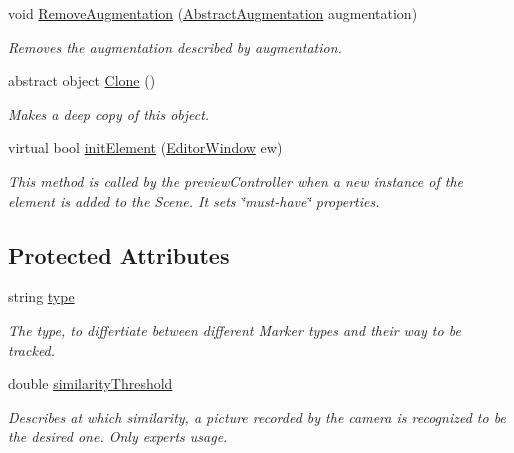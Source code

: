 \begin{DoxyCompactItemize}
void \hyperlink{class_a_rdev_kit_1_1_model_1_1_project_1_1_abstract_trackable_ae14b72d85d610bcda17d93255bce45f7}{Remove\-Augmentation} (\hyperlink{class_a_rdev_kit_1_1_model_1_1_project_1_1_abstract_augmentation}{Abstract\-Augmentation} augmentation)
\begin{DoxyCompactList}\small\item\em Removes the augmentation described by augmentation. \end{DoxyCompactList}\item 
abstract object \hyperlink{class_a_rdev_kit_1_1_model_1_1_project_1_1_abstract_trackable_a166fc03dc00911591baca14a3341ef29}{Clone} ()
\begin{DoxyCompactList}\small\item\em Makes a deep copy of this object. \end{DoxyCompactList}\item 
virtual bool \hyperlink{class_a_rdev_kit_1_1_model_1_1_project_1_1_abstract_trackable_aff50ed9cb95973d56d6a65bd1ef96c0a}{init\-Element} (\hyperlink{class_a_rdev_kit_1_1_editor_window}{Editor\-Window} ew)
\begin{DoxyCompactList}\small\item\em This method is called by the preview\-Controller when a new instance of the element is added to the Scene. It sets \char`\"{}must-\/have\char`\"{} properties. \end{DoxyCompactList}\end{DoxyCompactItemize}
\subsection*{Protected Attributes}
\begin{DoxyCompactItemize}
\item 
string \hyperlink{class_a_rdev_kit_1_1_model_1_1_project_1_1_abstract_trackable_ab6faf8843d1e9a61b353286a8d583231}{type}
\begin{DoxyCompactList}\small\item\em The type, to differtiate between different Marker types and their way to be tracked. \end{DoxyCompactList}\item 
double \hyperlink{class_a_rdev_kit_1_1_model_1_1_project_1_1_abstract_trackable_a5a74b70a54b9bb1f4fbad46e08a2e0cd}{similarity\-Threshold}
\begin{DoxyCompactList}\small\item\em Describes at which similarity, a picture recorded by the camera is recognized to be the desired one. Only experts usage. \end{DoxyCompactList}\end{DoxyCompactItemize}
